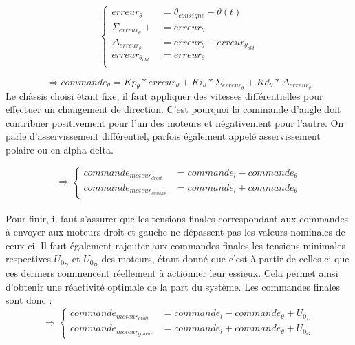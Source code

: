 \documentclass[a4paper,11pt]{article}
\begin{document}
\begin{equation*}
    \left\{
        \begin{aligned}
            erreur_{\theta} & = \theta_{consigne} - \theta(t)\\
            \Sigma_{erreur_{\theta}} +&= erreur_{\theta}\\
            \Delta_{erreur_{\theta}} & = erreur_{\theta} - erreur_{\theta_{old}}\\
            erreur_{\theta_{old}} & = erreur_{\theta}\\
        \end{aligned}
    \right.
\end{equation*}

\begin{equation*}
    \Rightarrow commande_{\theta} = Kp_{\theta}*erreur_{\theta}+Ki_{\theta}*\Sigma_{erreur_{\theta}}+Kd_{\theta}*\Delta_{erreur_{\theta}}
\end{equation*}
Le châssis choisi étant fixe, il faut appliquer des vitesses différentielles pour effectuer un changement de direction. C'est pourquoi la commande d'angle doit contribuer positivement pour l'un des moteurs et négativement pour l'autre. On parle d'asservissement différentiel, parfois également appelé asservissement polaire ou en alpha-delta.\cite{rouviere_asservissement_2007}


\begin{equation*}
    \Rightarrow\left\{
        \begin{aligned}
           commande_{moteur_{droit}} & = commande_{l} - commande_{\theta}\\
           commande_{moteur_{gauche}} & = commande_{l} + commande_{\theta}
           \end{aligned}
    \right.
\end{equation*}\\
Pour finir, il faut s'assurer que les tensions finales correspondant aux commandes à envoyer aux moteurs droit et gauche ne dépassent pas les valeurs nominales de ceux-ci. Il faut également rajouter aux commandes finales les tensions minimales respectives $U_{0_{D}}$ et $U_{0_{D}}$ des moteurs, étant donné que c'est à partir de celles-ci que ces derniers commencent réellement à actionner leur essieux. Cela permet ainsi d'obtenir une réactivité optimale de la part du système. Les commandes finales sont donc :
\begin{equation*}
    \Rightarrow\left\{
        \begin{aligned}
           commande_{moteur_{droit}} & = commande_{l} - commande_{\theta}+U_{0_{D}}\\
           commande_{moteur_{gauche}} & = commande_{l} + commande_{\theta}+U_{0_{G}}
           \end{aligned}
    \right.
\end{equation*}\\
\end{document}
